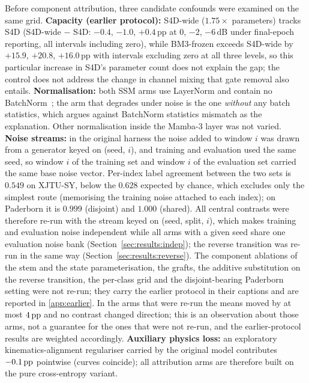 Before component attribution, three candidate confounds were examined on the same grid. \textbf{Capacity (earlier protocol):} S4D-wide ($1.75\times$ parameters) tracks S4D (S4D-wide $-$ S4D: $-0.4$, $-1.0$, $+0.4$\,pp at $0$, $-2$, $-6$\,dB under final-epoch reporting, all intervals including zero), while BM3-frozen exceeds S4D-wide by $+15.9$, $+20.8$, $+16.0$\,pp with intervals excluding zero at all three levels, so this particular increase in S4D's parameter count does not explain the gap; the control does not address the change in channel mixing that gate removal also entails. \textbf{Normalisation:} both SSM arms use LayerNorm and contain no BatchNorm~\cite{ioffe2015bn}; the arm that degrades under noise is the one \emph{without} any batch statistics, which argues against BatchNorm statistics mismatch as the explanation. Other normalisation inside the Mamba-3 layer was not varied. \textbf{Noise streams:} in the original harness the noise added to window $i$ was drawn from a generator keyed on (seed, $i$), and training and evaluation used the same seed, so window $i$ of the training set and window $i$ of the evaluation set carried the same base noise vector. Per-index label agreement between the two sets is $0.549$ on XJTU-SY, below the $0.628$ expected by chance, which excludes only the simplest route (memorising the training noise attached to each index); on Paderborn it is $0.999$ (disjoint) and $1.000$ (shared). All central contrasts were therefore re-run with the stream keyed on (seed, split, $i$), which makes training and evaluation noise independent while all arms with a given seed share one evaluation noise bank (Section~\ref{sec:results:indep}); the reverse transition was re-run in the same way (Section~\ref{sec:results:reverse}). The component ablations of the stem and the state parameterisation, the grafts, the additive substitution on the reverse transition, the per-class grid and the disjoint-bearing Paderborn setting were not re-run; they carry the earlier protocol in their captions and are reported in \ref{app:earlier}. In the arms that were re-run the means moved by at most $4\,\mathrm{pp}$ and no contrast changed direction; this is an observation about those arms, not a guarantee for the ones that were not re-run, and the earlier-protocol results are weighted accordingly. \textbf{Auxiliary physics loss:} an exploratory kinematics-alignment regulariser carried by the original model contributes $-0.1\,\mathrm{pp}$ pointwise (curves coincide); all attribution arms are therefore built on the pure cross-entropy variant.

